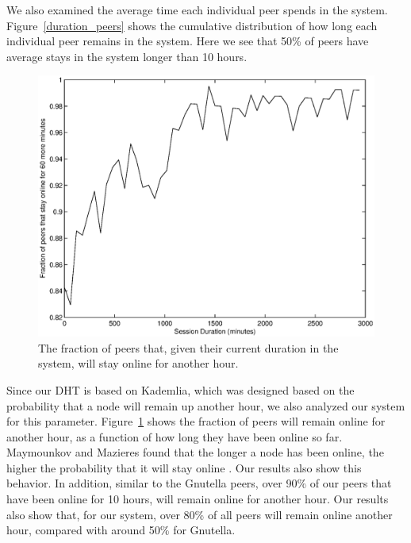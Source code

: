 \documentclass[conference]{IEEEtran}
\begin{document}
We also examined the average time each individual peer spends in the
system. Figure~\ref{duration_peers} shows the cumulative
distribution of how long each individual peer remains in the system.
Here we see that 50\% of peers have average stays in the system
longer than 10 hours.

\begin{figure}
\centering
\includegraphics[width=\columnwidth]{AptP2PDuration-online_1.eps}
\caption{The fraction of peers that, given their current duration in
the system, will stay online for another hour.}
\label{duration_online_1}
\end{figure}

Since our DHT is based on Kademlia, which was designed based on the
probability that a node will remain up another hour, we also
analyzed our system for this parameter.
Figure~\ref{duration_online_1} shows the fraction of peers will
remain online for another hour, as a function of how long they have
been online so far. Maymounkov and Mazieres found that the longer a
node has been online, the higher the probability that it will stay
online \cite{kademlia}. Our results also show this behavior. In
addition, similar to the Gnutella peers, over 90\% of our peers that
have been online for 10 hours, will remain online for another hour.
Our results also show that, for our system, over 80\% of all peers
will remain online another hour, compared with around 50\% for
Gnutella.
\end{document}
